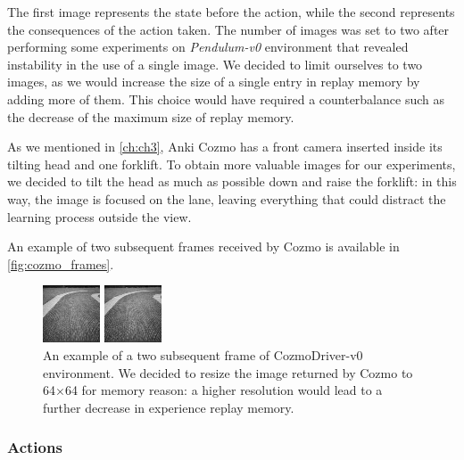 The first image represents the state before the action, while the second represents the consequences of the action taken.
The number of images was set to two after performing some experiments on \textit{Pendulum-v0} environment that revealed instability in the use of a single image.
We decided to limit ourselves to two images, as we would increase the size of a single entry in replay memory by adding more of them.
This choice would have required a counterbalance such as the decrease of the maximum size of replay memory.

As we mentioned in \vref{ch:ch3}, Anki Cozmo has a front camera inserted inside its tilting head and one forklift.
To obtain more valuable images for our experiments, we decided to tilt the head as much as possible down and raise the forklift: in this way, the image is focused on the lane, leaving everything that could distract the learning process outside the view.

An example of two subsequent frames received by Cozmo is available in \vref{fig:cozmo_frames}.
\begin{figure}

    \begin{minipage}[t]{0.5\linewidth}
        \centering
        \includegraphics[height=0.25\paperwidth]{img/cozmo_frame_1.jpg}
    \end{minipage}
    \begin{minipage}[t]{0.5\linewidth}
        \centering
        \includegraphics[height=0.25\paperwidth]{img/cozmo_frame_2.jpg}
    \end{minipage}

    \caption[Example of two subsequent frames of CozmoDriver-v0]{An example of a two subsequent frame of CozmoDriver-v0 environment.
        We decided to resize the image returned by Cozmo to 64$\times$64 for memory reason: a higher resolution would lead to a further decrease in experience replay memory.}
    \label{fig:cozmo_frames}
\end{figure}

\subsubsection{Actions}

